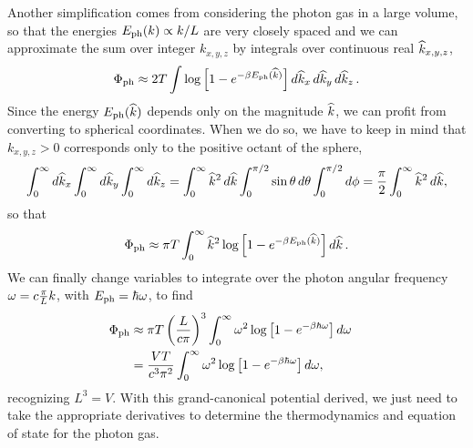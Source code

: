 Another simplification comes from considering the photon gas in a large volume, so that the energies $E_{\text{ph}}(k) \propto k / L$ are very closely spaced and we can approximate the sum over integer $k_{x, y, z}$ by integrals over continuous real $\widehat k_{x, y, z}$, %
\begin{equation*}
  \Phi_{\text{ph}} \approx 2T \int \log\left[1 - e^{-\beta E_{\text{ph}}(\widehat k)}\right] \mathop{d\widehat k_x} \mathop{d\widehat k_y} \mathop{d\widehat k_z}.
\end{equation*}
Since the energy $E_{\text{ph}}(\widehat k)$ depends only on the magnitude $\widehat k$, we can profit from converting to spherical coordinates.
When we do so, we have to keep in mind that $k_{x, y, z} > 0$ corresponds only to the positive octant of the sphere, %
\begin{equation*}
  \int_0^{\infty} d\widehat k_x \int_0^{\infty} d\widehat k_y \int_0^{\infty} d\widehat k_z = \int_0^{\infty} \widehat k^2 \mathop{d\widehat k} \int_0^{\pi / 2} \sin\theta \mathop{d\theta} \int_0^{\pi / 2} d\phi = \frac{\pi}{2} \int_0^{\infty} \widehat k^2 \mathop{d\widehat k},
\end{equation*}
so that
\begin{equation*}
  \Phi_{\text{ph}} \approx \pi T \int_0^{\infty} \widehat k^2 \log\left[1 - e^{-\beta E_{\text{ph}}(\widehat k)}\right] \mathop{d\widehat k}.
\end{equation*}
We can finally change variables to integrate over the photon angular frequency $\omega = c \frac{\pi}{L} k$, with $E_{\text{ph}} = \hbar \omega$, to find
\begin{align}
  \Phi_{\text{ph}} & \approx \pi T \left(\frac{L}{c \pi}\right)^3 \int_0^{\infty} \omega^2 \log\left[1 - e^{-\beta \hbar \omega}\right] \mathop{d\omega} \cr
                   & = \frac{VT}{c^3 \pi^2} \int_0^{\infty} \omega^2 \log\left[1 - e^{-\beta \hbar \omega}\right] \mathop{d\omega}, \label{eq:photon_grand}
\end{align}
recognizing $L^3 = V$.
With this grand-canonical potential derived, we just need to take the appropriate derivatives to determine the thermodynamics and equation of state for the photon gas.



